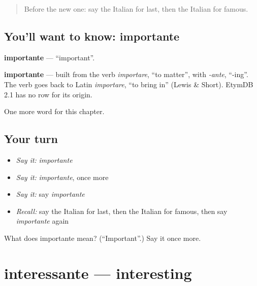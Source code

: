 \label{lesson:IT-C125-importante}



\begin{quote}
Before the new one: say the Italian for last, then the Italian for famous.
\end{quote}

\subsection*{You'll want to know: importante}
\textbf{importante} — \textquotedblleft{}important\textquotedblright{}.

\begin{cousinweb}
\textbf{importante} — built from the verb \emph{importare}, \textquotedblleft{}to matter\textquotedblright{}, with \emph{-ante}, \textquotedblleft{}-ing\textquotedblright{}. The verb goes back to Latin \emph{importare}, \textquotedblleft{}to bring in\textquotedblright{} (Lewis \& Short). EtymDB 2.1 has no row for its origin.
\end{cousinweb}

\begin{grammarlens}[title={What you've built}]
One more word for this chapter.
\end{grammarlens}

\subsection*{Your turn}
\begin{itemize}
\raggedright
  \item \emph{Say it:} \emph{importante}
  \item \emph{Say it:} \emph{importante}, once more
  \item \emph{Say it:} say \emph{importante}
  \item \emph{Recall:} say the Italian for last, then the Italian for famous, then say \emph{importante} again
\end{itemize}

\begin{tcolorbox}[breakable,colback=teal!4,colframe=teal!35!black,title={Before you move on}]
What does importante mean? (\textquotedblleft{}Important\textquotedblright{}.) Say it once more.
\end{tcolorbox}
\section[interessante]{interessante — interesting}

